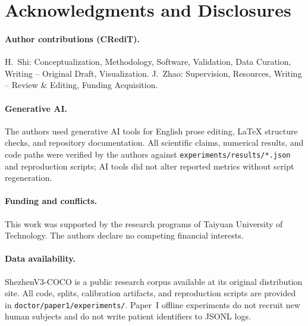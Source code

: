 \section*{Acknowledgments and Disclosures}

\paragraph{Author contributions (CRediT).}
H.~Shi: Conceptualization, Methodology, Software, Validation, Data Curation, Writing -- Original Draft, Visualization.
J.~Zhao: Supervision, Resources, Writing -- Review \& Editing, Funding Acquisition.

\paragraph{Generative AI.}
The authors used generative AI tools for English prose editing, LaTeX structure checks, and repository documentation.
All scientific claims, numerical results, and code paths were verified by the authors against \texttt{experiments/results/*.json} and reproduction scripts; AI tools did not alter reported metrics without script regeneration.

\paragraph{Funding and conflicts.}
This work was supported by the research programs of Taiyuan University of Technology.
The authors declare no competing financial interests.

\paragraph{Data availability.}
ShezhenV3-COCO is a public research corpus available at its original distribution site.
All code, splits, calibration artifacts, and reproduction scripts are provided in \texttt{doctor/paper1/experiments/}.
Paper~I offline experiments do not recruit new human subjects and do not write patient identifiers to JSONL logs.
